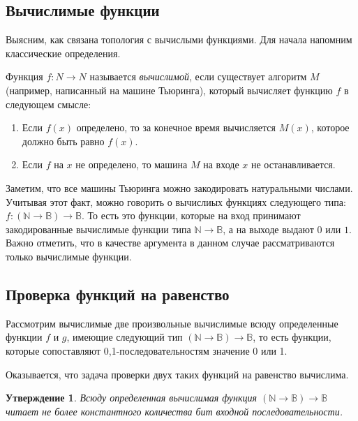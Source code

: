 \documentclass{article}
\newtheorem{myclaim}{Утверждение}
\begin{document}
\subsection{Вычислимые функции}

Выясним, как связана топология с вычислыми функциями.  
Для начала напомним классические определения.

Функция $f: N \to N$ называется \emph{вычислимой}, если существует алгоритм $M$
(например, написанный на машине Тьюринга), который вычисляет функцию $f$
в следующем смысле:
\begin{enumerate}
\item
Если $f(x)$ определено, то за конечное время вычисляется $M(x)$, которое должно быть
равно $f(x)$.

\item
Если $f$ на $x$ не определено, то машина $M$ на входе $x$ не останавливается.

\end{enumerate}

Заметим, что все машины Тьюринга можно закодировать натуральными числами.
Учитывая этот факт, можно говорить о вычислиых функциях следующего типа:
$f : (\mathbb{N} \to \mathbb{B}) \to \mathbb{B}$. То есть это функции, которые
на вход принимают закодированные вычислимые функции типа $\mathbb{N} \to \mathbb{B}$, 
а на выходе выдают $0$ или $1$. Важно отметить, что в качестве аргумента в данном
случае рассматриваются только вычислимые функции.



\subsection{Проверка функций на равенство}
Рассмотрим вычислимые две произвольные вычислимые всюду определенные функции $f$ и $g$,
имеющие следующий тип $(\mathbb{N} \to \mathbb{B}) \to \mathbb{B}$, то есть функции,
которые сопоставляют 0,1-последовательностям значение 0 или 1.

Оказывается, что задача проверки двух таких функций на равенство вычислима.

\begin{myclaim}
Всюду определенная вычислимая функция $(\mathbb{N} \to \mathbb{B}) \to \mathbb{B}$
читает не более константного количества бит входной последовательности.
\end{myclaim}
\end{document}
